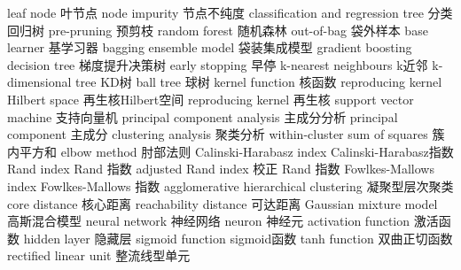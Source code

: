 {leaf node} 
{叶节点}
{node impurity} 
{节点不纯度}
{classification and regression tree} 
{分类回归树}
{pre-pruning} 
{预剪枝}
{random forest} 
{随机森林}
{out-of-bag} 
{袋外样本}
{base learner} 
{基学习器}
{bagging ensemble model} 
{袋装集成模型}
{gradient boosting decision tree} 
{梯度提升决策树}
{early stopping} 
{早停}
{k-nearest neighbours} 
{k近邻}
{k-dimensional tree}
{KD树}
{ball tree}
{球树}
{kernel function} 
{核函数}
{reproducing kernel Hilbert space} 
{再生核Hilbert空间}
{reproducing kernel} 
{再生核}
{support vector machine} 
{支持向量机}
{principal component analysis} 
{主成分分析}
{principal component} 
{主成分}
{clustering analysis} 
{聚类分析}
{within-cluster sum of squares} 
{簇内平方和}
{elbow method} 
{肘部法则}
{Calinski-Harabasz index} 
{Calinski-Harabasz指数}
{Rand index} 
{Rand 指数}
{adjusted Rand index} 
{校正 Rand 指数}
{Fowlkes-Mallows index} 
{Fowlkes-Mallows 指数}
{agglomerative hierarchical clustering} 
{凝聚型层次聚类}
{core distance} 
{核心距离}
{reachability distance} 
{可达距离}
{Gaussian mixture model}
{高斯混合模型}
{neural network} 
{神经网络}
{neuron} 
{神经元}
{activation function} 
{激活函数}
{hidden layer} 
{隐藏层}
{sigmoid function} 
{sigmoid函数}
{tanh function} 
{双曲正切函数}
{rectified linear unit} 
{整流线型单元}
